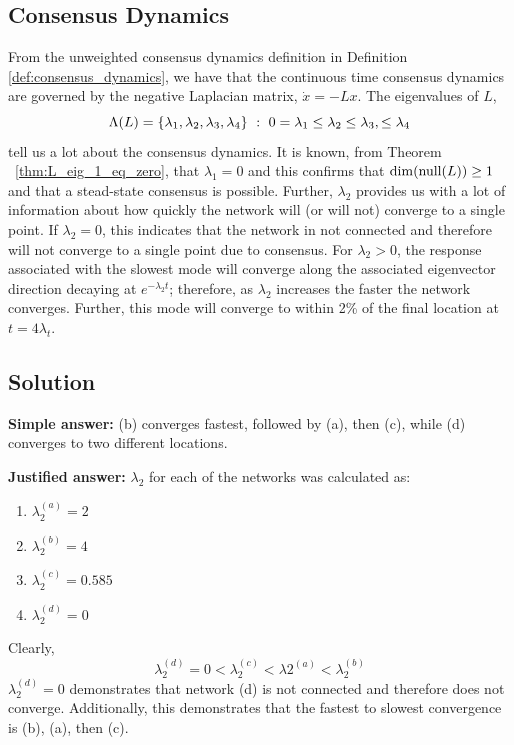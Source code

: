 \documentclass[]{article}
\numberwithin{equation}{section}
\newcommand{\st}{\ : \ }
\begin{document}
\subsection{Consensus Dynamics}
From the unweighted consensus dynamics definition in Definition \ref{def:consensus_dynamics}, we have that the continuous time consensus dynamics are governed by the negative Laplacian matrix, $\dot{x} = - L x$.
The eigenvalues of $L$, \[
	\Lambda(L) = \qty{\lambda_1, \lambda_2, \lambda_3, \lambda_4} 
	\st 0 = \lambda_1 \leq \lambda_2 \leq \lambda_3, \leq \lambda_4
\] tell us a lot about the consensus dynamics.
It is known, from Theorem \ \ref{thm:L_eig_1_eq_zero}, that $\lambda_1 = 0$ and this confirms that $\dim(\textnormal{null}\qty(L)) \geq 1$ and that a stead-state consensus is possible.
Further, $\lambda_2$ provides us with a lot of information about how quickly the network will (or will not) converge to a single point.
If $\lambda_2 = 0$, this indicates that the network in not connected and therefore will not converge to a single point due to consensus.
For $\lambda_2 > 0$, the response associated with the slowest mode will converge along the associated eigenvector direction decaying at $e^{-\lambda_2 t}$; 
therefore, as $\lambda_2$ increases the faster the network converges.
Further, this mode will converge to within 2\% of the final location at $t = 4 \lambda_t$.

\newpage
\subsection{Solution}
\textbf{Simple answer:} 
(b) converges fastest, followed by (a), then (c), while (d) converges to two different locations.

\textbf{Justified answer:} 
$\lambda_2$ for each of the networks was calculated as:
\begin{enumerate}
	\item $\lambda_{2}^{(a)} = 2$
	\item $\lambda_{2}^{(b)} = 4$
	\item $\lambda_{2}^{(c)} = 0.585$
	\item $\lambda_{2}^{(d)} = 0$
\end{enumerate}
Clearly, \[
	\lambda_{2}^{(d)} = 0 < \lambda_{2}^{(c)} < \lambda{2}^{(a)} < \lambda_{2}^{(b)}
\] 
$\lambda_{2}^{(d)} = 0$ demonstrates that network (d) is not connected and therefore does not converge.
Additionally, this demonstrates that the fastest to slowest convergence is (b), (a), then (c).
\end{document}

